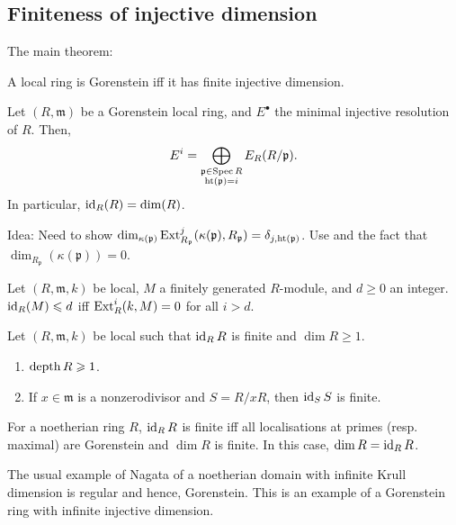 \documentclass[12pt]{article}
\begin{document}
\subsection{Finiteness of injective dimension}
The main theorem:
\begin{thm}
	A local ring is Gorenstein iff it has finite injective dimension.
\end{thm}
\begin{thm}
	Let $(R, \mathfrak{m})$ be a Gorenstein local ring, and $E^{\bullet}$ the minimal injective resolution of $R$. Then, 
	\begin{equation*} 
		E^{i} = \bigoplus_{\substack{\mathfrak{p} \in \operatorname{Spec} R \\ \operatorname{ht}(\mathfrak{p}) = i}} E_{R}(R/\mathfrak{p}).
	\end{equation*}
	In particular, $\operatorname{id}_{R}(R) = \dim(R)$.
\end{thm}
Idea: Need to show $\dim_{\kappa(\mathfrak{p})} \operatorname{Ext}_{R_{\mathfrak{p}}}^{j}(\kappa(\mathfrak{p}), R_{\mathfrak{p}}) = \delta_{j, \operatorname{ht}(\mathfrak{p})}$. Use  and the fact that $\dim_{R_{\mathfrak{p}}}(\kappa(\mathfrak{p})) = 0$.

\begin{prop}
	Let $(R, \mathfrak{m}, k)$ be local, $M$ a finitely generated $R$-module, and $d \ge 0$ an integer. $\operatorname{id}_{R}(M) \leqslant d$ iff $\operatorname{Ext}_{R}^{i}(k, M) = 0$ for all $i > d$.
\end{prop}

\begin{lem} 
	Let $(R, \mathfrak{m}, k)$ be local such that $\operatorname{id}_{R} R$ is finite and $\dim R \ge 1$.
	\begin{enumerate}[label=(\alph*)]
		\item $\operatorname{depth} R \geqslant 1$.
		\item If $x \in \mathfrak{m}$ is a nonzerodivisor and $S = R/xR$, then $\operatorname{id}_{S} S$ is finite.
	\end{enumerate}
\end{lem}

\begin{thm}
	For a noetherian ring $R$, $\operatorname{id}_{R} R$ is finite iff all localisations at primes (resp. maximal) are Gorenstein and $\dim R$ is finite. In this case, $\dim R = \operatorname{id}_{R} R$.
\end{thm}

\begin{rem}
	The usual example of Nagata of a noetherian domain with infinite Krull dimension is regular and hence, Gorenstein. This is an example of a Gorenstein ring with infinite injective dimension.
\end{rem}
\end{document}

